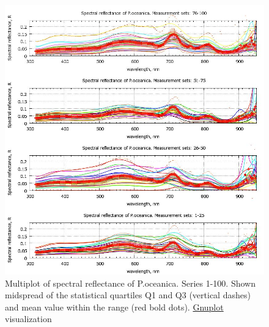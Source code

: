 \documentclass[10pt, a4paper]{article}
\begin{document}
\begin{figure}
	\begin{center}
		\includegraphics[scale=0.45]{GNU-13.jpg}
		\caption{Multiplot of spectral reflectance of P.oceanica. Series 1-100. Shown midspread of the statistical quartiles Q1 and Q3 (vertical dashes) and
			mean value within the range (red bold dots). \href{http://www.gnuplot.info/}{Gnuplot} visualization­}
		\label{fig:4.13}
	\end{center}
\end{figure}
\end{document}
